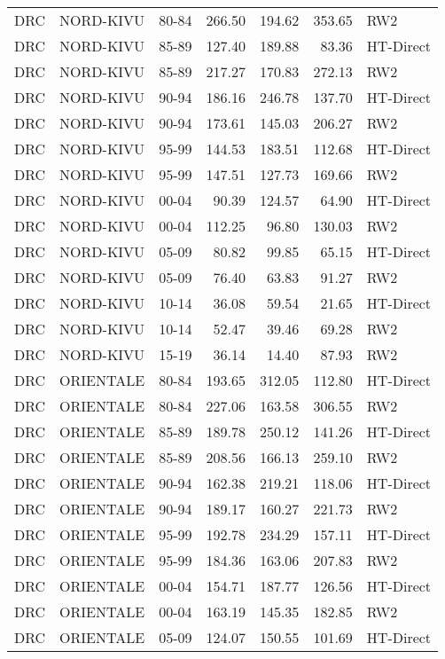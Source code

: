 \begin{longtable}{lllrrrl}
  DRC & NORD-KIVU & 80-84 & 266.50 & 194.62 & 353.65 & RW2 \\ 
  DRC & NORD-KIVU & 85-89 & 127.40 & 189.88 & 83.36 & HT-Direct \\ 
  DRC & NORD-KIVU & 85-89 & 217.27 & 170.83 & 272.13 & RW2 \\ 
  DRC & NORD-KIVU & 90-94 & 186.16 & 246.78 & 137.70 & HT-Direct \\ 
  DRC & NORD-KIVU & 90-94 & 173.61 & 145.03 & 206.27 & RW2 \\ 
  DRC & NORD-KIVU & 95-99 & 144.53 & 183.51 & 112.68 & HT-Direct \\ 
  DRC & NORD-KIVU & 95-99 & 147.51 & 127.73 & 169.66 & RW2 \\ 
  DRC & NORD-KIVU & 00-04 & 90.39 & 124.57 & 64.90 & HT-Direct \\ 
  DRC & NORD-KIVU & 00-04 & 112.25 & 96.80 & 130.03 & RW2 \\ 
  DRC & NORD-KIVU & 05-09 & 80.82 & 99.85 & 65.15 & HT-Direct \\ 
  DRC & NORD-KIVU & 05-09 & 76.40 & 63.83 & 91.27 & RW2 \\ 
  DRC & NORD-KIVU & 10-14 & 36.08 & 59.54 & 21.65 & HT-Direct \\ 
  DRC & NORD-KIVU & 10-14 & 52.47 & 39.46 & 69.28 & RW2 \\ 
  DRC & NORD-KIVU & 15-19 & 36.14 & 14.40 & 87.93 & RW2 \\ 
  DRC & ORIENTALE & 80-84 & 193.65 & 312.05 & 112.80 & HT-Direct \\ 
  DRC & ORIENTALE & 80-84 & 227.06 & 163.58 & 306.55 & RW2 \\ 
  DRC & ORIENTALE & 85-89 & 189.78 & 250.12 & 141.26 & HT-Direct \\ 
  DRC & ORIENTALE & 85-89 & 208.56 & 166.13 & 259.10 & RW2 \\ 
  DRC & ORIENTALE & 90-94 & 162.38 & 219.21 & 118.06 & HT-Direct \\ 
  DRC & ORIENTALE & 90-94 & 189.17 & 160.27 & 221.73 & RW2 \\ 
  DRC & ORIENTALE & 95-99 & 192.78 & 234.29 & 157.11 & HT-Direct \\ 
  DRC & ORIENTALE & 95-99 & 184.36 & 163.06 & 207.83 & RW2 \\ 
  DRC & ORIENTALE & 00-04 & 154.71 & 187.77 & 126.56 & HT-Direct \\ 
  DRC & ORIENTALE & 00-04 & 163.19 & 145.35 & 182.85 & RW2 \\ 
  DRC & ORIENTALE & 05-09 & 124.07 & 150.55 & 101.69 & HT-Direct \\ 

\end{longtable}

